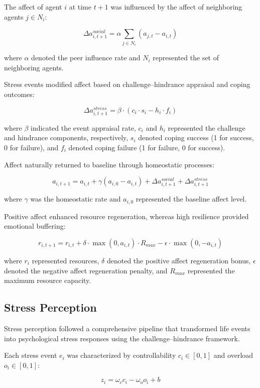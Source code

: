\documentclass[
  letterpaper,
  DIV=11,
  numbers=noendperiod]{scrartcl}
\begin{document}
The affect of agent \(i\) at time \(t+1\) was influenced by the affect
of neighboring agents \(j \in N_i\):

\[\Delta a_{i,t+1}^{social} = \alpha \sum_{j \in N_i} (a_{j,t} - a_{i,t})\]

where \(\alpha\) denoted the peer influence rate and \(N_i\) represented
the set of neighboring agents.

Stress events modified affect based on challenge--hindrance appraisal
and coping outcomes:

\[\Delta a_{i,t+1}^{stress} = \beta \cdot (c_i \cdot s_i - h_i \cdot f_i)\]

where \(\beta\) indicated the event appraisal rate, \(c_i\) and \(h_i\)
represented the challenge and hindrance components, respectively,
\(s_i\) denoted coping success (1 for success, 0 for failure), and
\(f_i\) denoted coping failure (1 for failure, 0 for success).

Affect naturally returned to baseline through homeostatic processes:

\[a_{i,t+1} = a_{i,t} + \gamma (a_{i,0} - a_{i,t}) + \Delta a_{i,t+1}^{social} + \Delta a_{i,t+1}^{stress}\]

where \(\gamma\) was the homeostatic rate and \(a_{i,0}\) represented
the baseline affect level.

Positive affect enhanced resource regeneration, whereas high resilience
provided emotional buffering:

\[r_{i,t+1} = r_{i,t} + \delta \cdot \max(0, a_{i,t}) \cdot R_{max} - \epsilon \cdot \max(0, -a_{i,t})\]

where \(r_i\) represented resources, \(\delta\) denoted the positive
affect regeneration bonus, \(\epsilon\) denoted the negative affect
regeneration penalty, and \(R_{max}\) represented the maximum resource
capacity.

\subsection{Stress Perception}\label{stress-perception}

Stress perception followed a comprehensive pipeline that transformed
life events into psychological stress responses using the
challenge--hindrance framework.

Each stress event \(e_i\) was characterized by controllability
\(c_i \in [0,1]\) and overload \(o_i \in [0,1]\):

\[z_i = \omega_c c_i - \omega_o o_i + b\]
\end{document}
